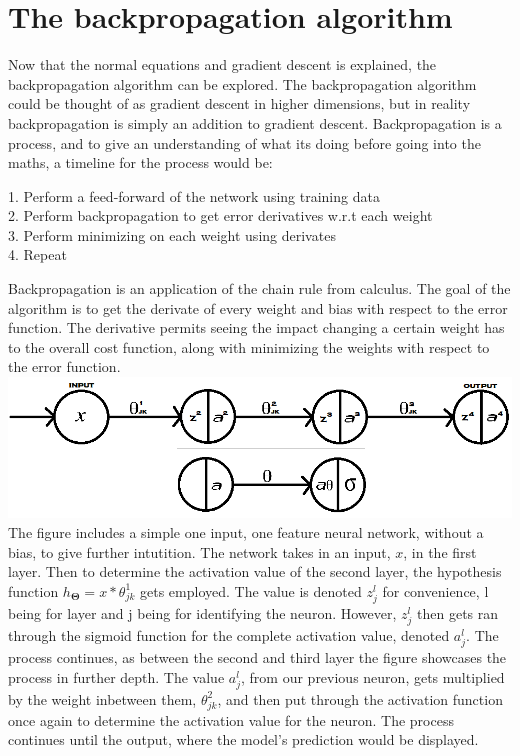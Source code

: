 \documentclass[a4paper,12pt]{article}
\begin{document}
\section{The backpropagation algorithm}
Now that the normal equations and gradient descent is explained, the backpropagation algorithm can be explored. The backpropagation algorithm could be thought of as gradient descent in higher dimensions, but in reality backpropagation is simply an addition to gradient descent. Backpropagation is a process, and to give an understanding of what its doing before going into the maths, a timeline for the process would be: 
\begin{center} 1. Perform a feed-forward of the network using training data
\\ 2. Perform backpropagation to get error derivatives w.r.t each weight
\\ 3. Perform minimizing on each weight using derivates
\\ 4. Repeat\end{center}
Backpropagation is an application of the chain rule from calculus. The goal of the algorithm is to get the derivate of every weight and bias with respect to the error function. The derivative permits seeing the impact changing a certain weight has to the overall cost function, along with minimizing the weights with respect to the error function. 
\\
\includegraphics[scale=0.56]{onedimension}
The figure includes a simple one input, one feature neural network, without a bias, to give further intutition. The network takes in an input, $x$, in the first layer. Then to determine the activation value of the second layer, the hypothesis function $h_{\boldsymbol{\Theta}} = x*\theta_{jk}^1$ gets employed. The value is denoted $z^l_j$ for convenience, l being for layer and j being for identifying the neuron. However, $z^l_j$ then gets ran through the sigmoid function for the complete activation value, denoted $a^l_j$. The process continues, as between the second and third layer the figure showcases the process in further depth. The value $a^l_j$, from our previous neuron, gets multiplied by the weight inbetween them, $\theta_{jk}^2$, and then put through the activation function once again to determine the activation value for the neuron. The process continues until the output, where the model's prediction would be displayed. 
\end{document}

